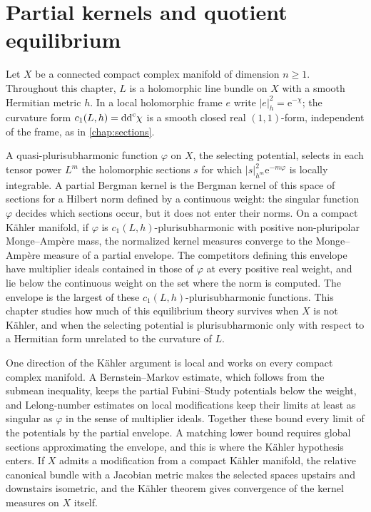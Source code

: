 \chapter{Partial kernels and quotient equilibrium}
\label{chap:partial-bergman}

\begingroup
{}

Let $X$ be a connected compact complex manifold of dimension $n\geq1$. Throughout this chapter, $L$ is a holomorphic line bundle on $X$ with a smooth Hermitian metric $h$. In a local holomorphic frame $e$ write $|e|_h^2=\mathrm{e}^{-\chi}$; the curvature form $c_1(L,h)=\mathrm{dd}^{\mathrm{c}}\chi$ is a smooth closed real $(1,1)$-form, independent of the frame, as in \cref{chap:sections}.

A quasi-plurisubharmonic function $\varphi$ on $X$, the selecting potential, selects in each tensor power $L^m$ the holomorphic sections $s$ for which $|s|_{h^m}^2\mathrm{e}^{-m\varphi}$ is locally integrable. A partial Bergman kernel is the Bergman kernel of this space of sections for a Hilbert norm defined by a continuous weight: the singular function $\varphi$ decides which sections occur, but it does not enter their norms. On a compact K\"ahler manifold, if $\varphi$ is $c_1(L,h)$-plurisubharmonic with positive non-pluripolar Monge--Amp\`ere mass, the normalized kernel measures converge to the Monge--Amp\`ere measure of a partial envelope. The competitors defining this envelope have multiplier ideals contained in those of $\varphi$ at every positive real weight, and lie below the continuous weight on the set where the norm is computed. The envelope is the largest of these $c_1(L,h)$-plurisubharmonic functions. This chapter studies how much of this equilibrium theory survives when $X$ is not K\"ahler, and when the selecting potential is plurisubharmonic only with respect to a Hermitian form unrelated to the curvature of $L$.

One direction of the K\"ahler argument is local and works on every compact complex manifold. A Bernstein--Markov estimate, which follows from the submean inequality, keeps the partial Fubini--Study potentials below the weight, and Lelong-number estimates on local modifications keep their limits at least as singular as $\varphi$ in the sense of multiplier ideals. Together these bound every limit of the potentials by the partial envelope. A matching lower bound requires global sections approximating the envelope, and this is where the K\"ahler hypothesis enters. If $X$ admits a modification from a compact K\"ahler manifold, the relative canonical bundle with a Jacobian metric makes the selected spaces upstairs and downstairs isometric, and the K\"ahler theorem gives convergence of the kernel measures on $X$ itself.

